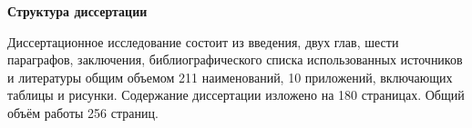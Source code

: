 \textbf{Структура диссертации}

Диссертационное исследование состоит из введения, двух глав, шести параграфов, заключения, библиографического списка использованных источников и литературы общим объемом 211 наименований, 10 приложений, включающих таблицы и рисунки. Содержание диссертации изложено на 180 страницах. Общий объём работы 256 страниц.

